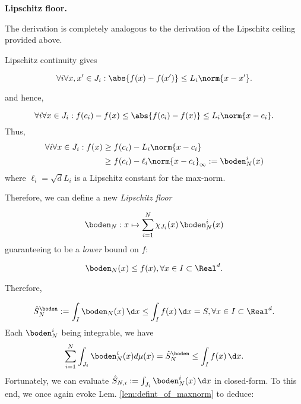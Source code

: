 \textbf{Lipschitz floor.}

The derivation is completely analogous to the derivation of the Lipschitz ceiling provided above. 

Lipschitz continuity gives

\[\forall i \forall x,x' \in J_i: \abs{f(x) - f(x')} \leq L_i \norm{x-x'}. \]

and hence, 

\[\forall i \forall x \in J_i: f(c_i) - f(x) \leq\abs{f(c_i) - f(x)} \leq L_i \norm{x-c_i}. \]
Thus, 
\begin{align}
\forall i \forall x \in J_i: f(x)  &\geq f(c_i) - L_i \norm{x-c_i} \\
&\geq f(c_i) - \ell_i \norm{x-c_i}_{\infty}:= \boden^i_N(x)
\end{align}
where $\ell_i = \sqrt d L_i$ is a Lipschitz constant for the max-norm.

Therefore, we can define a new \textit{Lipschitz floor} 

\[\boden_N: x \mapsto \sum_{i=1}^N \chi_{J_i} (x) \, \boden^i_N(x)\]
guaranteeing to be a \emph{lower} bound on $f$:

\[\boden_N( x) \leq f(x), \forall x \in I \subset \Real^d.\]

Therefore, 

\[\hat S_N^\boden:=\int_I \boden_N( x) \, \d x \leq \int_I f(x) \, \d x  = S, \forall x \in I \subset \Real^d.\]
Each $\boden^i_N$ being integrable, we have 
\begin{equation}
\sum_{i=1}^N \int_{J_i} \boden^i_N( x) d\mu(x)=\hat S_N^\boden \leq \int_I f(x) \, \d x.
\label{eq:defint_ceiling}
\end{equation}
Fortunately, we can evaluate $\hat S_{N,i} :=\int_{J_i} \boden^i_N( x) \, \d x$ in closed-form. To this end, we once again evoke Lem. \ref{lem:defint_of_maxnorm} to deduce:

